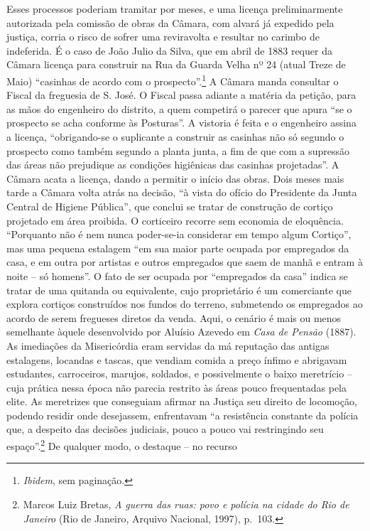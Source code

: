 Esses processos poderiam tramitar por meses, e uma licença
preliminarmente autorizada pela comissão de obras da Câmara, com alvará
já expedido pela justiça, corria o risco de sofrer uma reviravolta e
resultar no carimbo de indeferida. É o caso de João Julio da Silva, que
em abril de 1883 requer da Câmara licença para construir na Rua da
Guarda Velha nº 24 (atual Treze de Maio) ``casinhas de acordo com o
prospecto''.\footnote{\emph{Ibidem}, sem paginação.} A Câmara manda
consultar o Fiscal da freguesia de S. José. O Fiscal passa adiante a
matéria da petição, para as mãos do engenheiro do distrito, a quem
competirá o parecer que apura ``se o prospecto se acha conforme às
Posturas''. A vistoria é feita e o engenheiro assina a licença,
``obrigando-se o suplicante a construir as casinhas não só segundo o
prospecto como também segundo a planta junta, a fim de que com a
supressão das áreas não prejudique as condições higiênicas das casinhas
projetadas''. A Câmara acata a licença, dando a permitir o início das
obras. Dois meses mais tarde a Câmara volta atrás na decisão, ``à vista
do ofício do Presidente da Junta Central de Higiene Pública'', que
conclui se tratar de construção de cortiço projetado em área proibida. O
corticeiro recorre sem economia de eloquência. ``Porquanto não é nem
nunca poder-se-ia considerar em tempo algum Cortiço'', mas uma pequena
estalagem ``em sua maior parte ocupada por empregados da casa, e em
outra por artistas e outros empregados que saem de manhã e entram à
noite -- só homens''. O fato de ser ocupada por ``empregados da casa''
indica se tratar de uma quitanda ou equivalente, cujo proprietário é um
comerciante que explora cortiços construídos nos fundos do terreno,
submetendo os empregados ao acordo de serem fregueses diretos da venda.
Aqui, o cenário é mais ou menos semelhante àquele desenvolvido por
Aluísio Azevedo em \emph{Casa de Pensão} (1887). As imediações da
Misericórdia eram servidas da má reputação das antigas estalagens,
locandas e tascas, que vendiam comida a preço ínfimo e abrigavam
estudantes, carroceiros, marujos, soldados, e possivelmente o baixo
meretrício -- cuja prática nessa época não parecia restrito às áreas
pouco frequentadas pela elite. As meretrizes que conseguiam afirmar na
Justiça seu direito de locomoção, podendo residir onde desejassem,
enfrentavam ``a resistência constante da polícia que, a despeito das
decisões judiciais, pouco a pouco vai restringindo seu
espaço''.\footnote{Marcos Luiz Bretas, \emph{A guerra das ruas: povo e
  polícia na cidade do Rio de Janeiro} (Rio de Janeiro, Arquivo
  Nacional, 1997), p.~103.} De qualquer modo, o destaque -- no recurso
